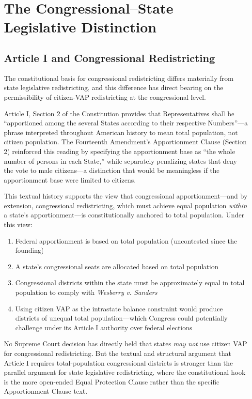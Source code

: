 \section{The Congressional--State Legislative Distinction}
\label{sec:congressional}

\subsection{Article I and Congressional Redistricting}

The constitutional basis for congressional redistricting differs materially from state legislative redistricting, and this difference has direct bearing on the permissibility of citizen-VAP redistricting at the congressional level.

Article I, Section 2 of the Constitution provides that Representatives shall be ``apportioned among the several States according to their respective Numbers''---a phrase interpreted throughout American history to mean total population, not citizen population. The Fourteenth Amendment's Apportionment Clause (Section 2) reinforced this reading by specifying the apportionment base as ``the whole number of persons in each State,'' while separately penalizing states that deny the vote to male citizens---a distinction that would be meaningless if the apportionment base were limited to citizens.

This textual history supports the view that congressional apportionment---and by extension, congressional redistricting, which must achieve equal population \emph{within} a state's apportionment---is constitutionally anchored to total population. Under this view:
\begin{enumerate}
    \item Federal apportionment is based on total population (uncontested since the founding)
    \item A state's congressional seats are allocated based on total population
    \item Congressional districts within the state must be approximately equal in total population to comply with \emph{Wesberry v. Sanders}~\citep{wesberry1964}
    \item Using citizen VAP as the intrastate balance constraint would produce districts of unequal total population---which Congress could potentially challenge under its Article I authority over federal elections
\end{enumerate}

No Supreme Court decision has directly held that states \emph{may not} use citizen VAP for congressional redistricting. But the textual and structural argument that Article I requires total-population congressional districts is stronger than the parallel argument for state legislative redistricting, where the constitutional hook is the more open-ended Equal Protection Clause rather than the specific Apportionment Clause text.

